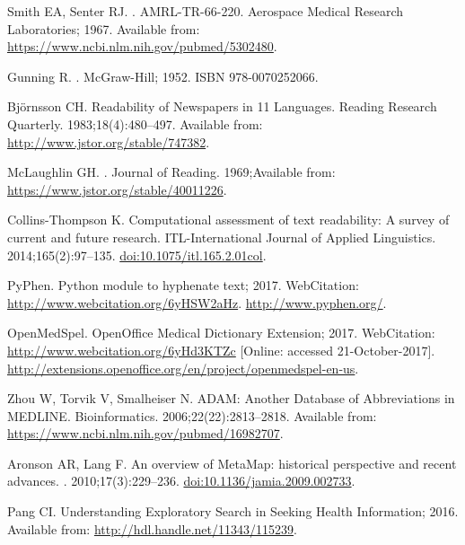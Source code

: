 \documentclass[10pt,a4paper]{article}
\begin{document}
\begin{thebibliography}{10}
	Smith EA, Senter RJ.
	.
	\newblock AMRL-TR-66-220. Aerospace Medical Research Laboratories; 1967.
	\newblock Available from: \url{https://www.ncbi.nlm.nih.gov/pubmed/5302480}.
	
	Gunning R.
	.
	\newblock McGraw-Hill; 1952.
	\newblock ISBN 978-0070252066.
	
	Bj{\"o}rnsson CH.
	\newblock Readability of Newspapers in 11 Languages.
	\newblock Reading Research Quarterly. 1983;18(4):480--497.
	\newblock Available from: \url{http://www.jstor.org/stable/747382}.
	
	McLaughlin GH.
	.
	\newblock Journal of Reading. 1969;Available from:
	\url{https://www.jstor.org/stable/40011226}.
	
	Collins-Thompson K.
	\newblock Computational assessment of text readability: A survey of current and
	future research.
	\newblock ITL-International Journal of Applied Linguistics.
	2014;165(2):97--135.
	\newblock \href {http://dx.doi.org/10.1075/itl.165.2.01col}
	{doi:10.1075/itl.165.2.01col}.
	
	PyPhen. Python module to hyphenate text; 2017.
	 WebCitation:
	\url{http://www.webcitation.org/6yHSW2aHz}.
	\newblock \url{http://www.pyphen.org/}.
	
	OpenMedSpel. OpenOffice Medical Dictionary Extension; 2017.
	\newblock WebCitation: \url{http://www.webcitation.org/6yHd3KTZc} [Online:
	accessed 21-October-2017].
	\newblock \url{http://extensions.openoffice.org/en/project/openmedspel-en-us}.
	
	Zhou W, Torvik V, Smalheiser N.
	\newblock ADAM: Another Database of Abbreviations in MEDLINE.
	\newblock Bioinformatics. 2006;22(22):2813--2818.
	\newblock Available from: \url{https://www.ncbi.nlm.nih.gov/pubmed/16982707}.
	
	Aronson AR, Lang F.
	\newblock An overview of MetaMap: historical perspective and recent advances.
	. 2010;17(3):229--236.
	\newblock \href {http://dx.doi.org/10.1136/jamia.2009.002733}
	{doi:10.1136/jamia.2009.002733}.
	
	Pang CI. Understanding Exploratory Search in Seeking Health Information; 2016.
	\newblock Available from: \url{http://hdl.handle.net/11343/115239}.
	

\end{thebibliography}
\end{document}
